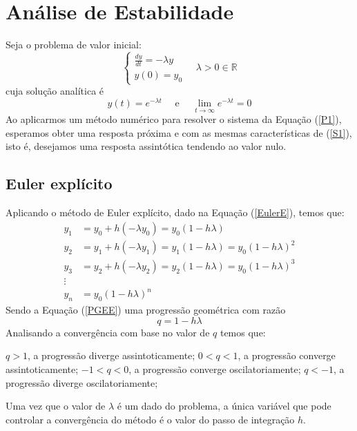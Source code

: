 \documentclass[12pt]{peqdoc}
\begin{document}
	\newpage
	\section{Análise de Estabilidade}
	
	Seja o problema de valor inicial:
	\begin{equation}
	\left\{\begin{matrix}\label{P1}
	\displaystyle\frac{dy}{dt}=-\lambda y\\y(0) = y_0
	\end{matrix}\right.\quad \lambda>0\in\mathbb{R}
	\end{equation}
	\noindent cuja solução analítica é
	\begin{equation}
	y(t)=e^{-\lambda t}  \quad\text{  e  } \quad\lim_{t\rightarrow\infty}{e^{-\lambda t}}=0\label{S1}\nonumber
	\end{equation}
	\noindent Ao aplicarmos um método numérico para resolver o sistema da Equação (\ref{P1}), esperamos obter uma resposta próxima e com as mesmas características de (\ref{S1}), isto é, desejamos uma resposta assintótica tendendo ao valor nulo.
	
	\subsection{Euler explícito}
	Aplicando o método de Euler explícito, dado na Equação (\ref{EulerE}), temos que:
	\begin{align}
	y_1 &= y_0 + h(-\lambda y_0) = y_0(1-h\lambda)\nonumber\\
	y_2 &= y_1 + h(-\lambda y_1) = y_1(1-h\lambda) = y_0(1-h\lambda)^2\nonumber\\
	y_3 &= y_2 + h(-\lambda y_2) = y_2(1-h\lambda) = y_0(1-h\lambda)^3\nonumber\\
	\vdots\nonumber\\
	y_n &= y_0(1-h\lambda)^n\label{PGEE}
	\end{align}
	\noindent Sendo a Equação (\ref{PGEE}) uma progressão geométrica com razão 
	\begin{equation}
	q = 1-h\lambda
	\end{equation}
	\noindent Analisando a convergência com base no valor de $ q $ temos que:
	\begin{outline}
		\1[(i)] $ q>1 $, a progressão diverge assintoticamente;
		\1[(ii)] $ 0<q<1 $, a progressão converge assintoticamente;
		\1[(iii)] $ -1<q<0 $, a progressão converge oscilatoriamente;
		\1[(iv)] $ q < -1 $, a progressão diverge oscilatoriamente;
	\end{outline} 
	\noindent Uma vez que o valor de $ \lambda $ é um dado do problema, a única variável que pode controlar a convergência do método é o valor do passo de integração $ h $.
	
\end{document}
